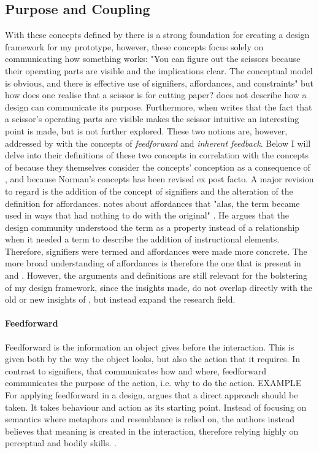 \subsection{Purpose and Coupling}
With these concepts defined by  there is a strong foundation for creating a design framework for my prototype, however, these concepts focus solely on communicating how something works: "You can figure out the scissors because their operating parts are visible and the implications clear. The conceptual model is obvious, and there is effective use of signifiers, affordances, and constraints" \cite[p. 27]{norman} but how does one realise that a scissor is for cutting paper?  does not describe how a design can communicate its purpose. Furthermore, when  writes that the fact that a scissor's operating parts are visible makes the scissor intuitive an interesting point is made, but is not further explored. These two notions are, however, addressed by  with the concepts of \textit{feedforward} and \textit{inherent feedback}. Below I will delve into their definitions of these two concepts in correlation with the concepts of  because they themselves consider the concepts' conception as a consequence of , and because Norman's concepts has been revised \cite{norman} ex post facto. A major revision to regard is the addition of the concept of signifiers and the alteration of the definition for affordances.  notes about affordances that "alas, the term became used in ways that had nothing to do with the original" \cite[p. 13]{norman}. He argues that the design community understood the term as a property instead of a relationship when it needed a term to describe the addition of instructional elements. Therefore, signifiers were termed and affordances were made more concrete. The more broad understanding of affordances is therefore the one that is present in  and . However, the arguments and definitions are still relevant for the bolstering of my design framework, since the insights made, do not overlap directly with the old or new insights of , but instead expand the research field.

\paragraph{Feedforward} Feedforward is the information an object gives before the interaction. This is given both by the way the object looks, but also the action that it requires. In contrast to signifiers, that communicates how and where, feedforward communicates the purpose of the action, i.e. why to do the action. EXAMPLE For applying feedforward in a design,  argues that a direct approach should be taken. It takes behaviour and action as its starting point. Instead of focusing on semantics where metaphors and resemblance is relied on, the authors instead believes that meaning is created in the interaction, therefore relying highly on perceptual and bodily skills. \cite{howdonald}.

